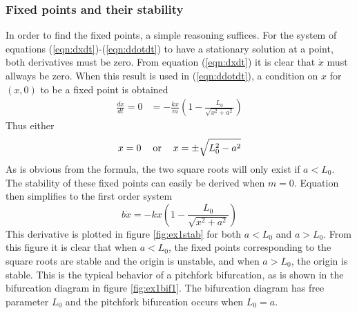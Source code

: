 \subsubsection{Fixed points and their stability}
In order to find the fixed points, a simple reasoning suffices. For the system of equations (\ref{eqn:dxdt})-(\ref{eqn:ddotdt}) to have a stationary solution at a point, both derivatives must be zero. From equation (\ref{eqn:dxdt}) it is clear that $\dot{x}$ must allways be zero. When this result is used in (\ref{eqn:ddotdt}), a condition on $x$ for $(x,0)$ to be a fixed point is obtained
\begin{align}
  \frac{d\dot{x}}{dt}=0&=-\frac{kx}{m}\left(1-\frac{L_0}{\sqrt{x^2+a^2}}\right)\label{eqn:ddotdt}
\end{align}
Thus either 
\begin{equation}
x=0 \mbox{\hspace{12pt}or\hspace{12pt}}x=\pm\sqrt{L_0^2-a^2}
\end{equation}
As is obvious from the formula, the two square roots will only exist if $a<L_0$. The stability of these fixed points can easily be derived when $m=0$. Equation\label{eqn:newton2order} then simplifies to the first order system
\begin{equation}
b\dot{x}=-kx\left(1-\frac{L_0}{\sqrt{x^2+a^2}}\right)\label{eqn:ex1firstorder}
\end{equation}
This derivative is plotted in figure \ref{fig:ex1stab} for both $a<L_0$ and $a>L_0$. From this figure it is clear that when $a<L_0$, the fixed points corresponding to the square roots are stable and the origin is unstable, and when $a>L_0$, the origin is stable. This is the typical behavior of a pitchfork bifurcation, as is shown in the bifurcation diagram in figure \ref{fig:ex1bif1}. The bifurcation diagram has free parameter $L_0$ and the pitchfork bifurcation occurs when $L_0=a$.
